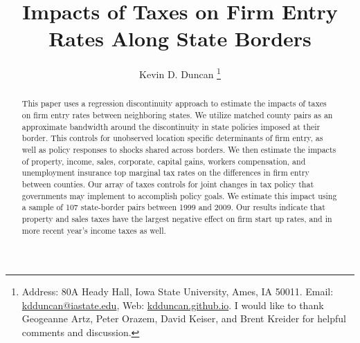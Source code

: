 \documentclass[12pt,a4paper]{article}
\renewcommand{\baselinestretch}{2}
\begin{document}
\title{Impacts of Taxes on Firm Entry Rates Along State Borders}
\author{Kevin D. Duncan \thanks{Address: 80A Heady Hall, Iowa State University, Ames, IA 50011. Email: \url{kdduncan@iastate.edu}, Web: \url{kdduncan.github.io}. I would like to thank Geogeanne Artz, Peter Orazem, David Keiser, and Brent Kreider for helpful comments and discussion.}}
\date{}
\maketitle

\begin{abstract}
This paper uses a regression discontinuity approach to estimate the impacts of taxes on firm entry rates between neighboring states. We utilize matched county pairs as an approximate bandwidth around the discontinuity in state policies imposed at their border. This controls for unobserved location specific determinants of firm entry, as well as policy responses to shocks shared across borders. We then estimate the impacts of property, income, sales, corporate, capital gains, workers compensation, and unemployment insurance top marginal tax rates on the differences in firm entry between counties. Our array of taxes controls for joint changes in tax policy that governments may implement to accomplish policy goals. We estimate this impact using a sample of 107 state-border pairs between 1999 and 2009. Our results indicate that property and sales taxes have the largest negative effect on firm start up rates, and in more recent year's income taxes as well.
\end{abstract}

\newpage








\renewcommand{\baselinestretch}{1.0} 
\end{document}

